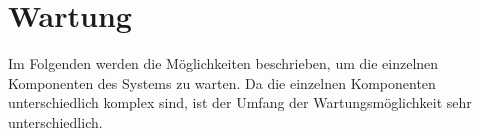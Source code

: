 \section{Wartung}
Im Folgenden werden die Möglichkeiten beschrieben, um die einzelnen Komponenten des Systems zu warten. 
Da die einzelnen Komponenten unterschiedlich komplex sind, ist der Umfang der Wartungsmöglichkeit sehr unterschiedlich.